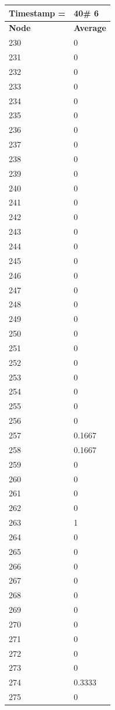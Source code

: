 \begin{tabular}{|l||l|}
\hline
\textbf{Timestamp =} & \textbf{40}\# 6\\\hline
	\textbf{Node} & \textbf{Average} \\ \hline
\hline
	230 & 0 \\ \hline
	231 & 0 \\ \hline
	232 & 0 \\ \hline
	233 & 0 \\ \hline
	234 & 0 \\ \hline
	235 & 0 \\ \hline
	236 & 0 \\ \hline
	237 & 0 \\ \hline
	238 & 0 \\ \hline
	239 & 0 \\ \hline
	240 & 0 \\ \hline
	241 & 0 \\ \hline
	242 & 0 \\ \hline
	243 & 0 \\ \hline
	244 & 0 \\ \hline
	245 & 0 \\ \hline
	246 & 0 \\ \hline
	247 & 0 \\ \hline
	248 & 0 \\ \hline
	249 & 0 \\ \hline
	250 & 0 \\ \hline
	251 & 0 \\ \hline
	252 & 0 \\ \hline
	253 & 0 \\ \hline
	254 & 0 \\ \hline
	255 & 0 \\ \hline
	256 & 0 \\ \hline
	257 & 0.1667 \\ \hline
	258 & 0.1667 \\ \hline
	259 & 0 \\ \hline
	260 & 0 \\ \hline
	261 & 0 \\ \hline
	262 & 0 \\ \hline
	263 & 1 \\ \hline
	264 & 0 \\ \hline
	265 & 0 \\ \hline
	266 & 0 \\ \hline
	267 & 0 \\ \hline
	268 & 0 \\ \hline
	269 & 0 \\ \hline
	270 & 0 \\ \hline
	271 & 0 \\ \hline
	272 & 0 \\ \hline
	273 & 0 \\ \hline
	274 & 0.3333 \\ \hline
	275 & 0 \\ \hline
\end{tabular}

